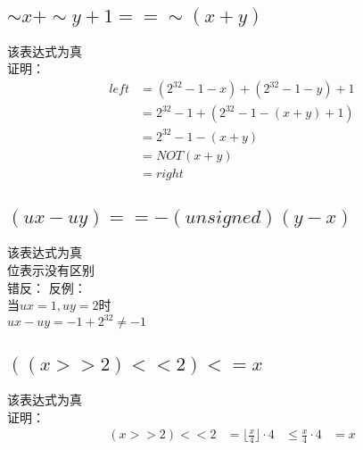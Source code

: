 \documentclass[12pt, a4paper, oneside]{ctexart}
\begin{document}
\subsection{$\sim x + \sim y + 1 == \sim (x + y)$}
\noindent
该表达式为真\\
证明：
\begin{equation}
    \begin{aligned}
        left &= (2^{32} - 1 - x) + (2^{32} - 1 - y) + 1\\
        &= 2^{32} - 1 + (2^{32} - 1 - (x + y) + 1)\\
        &= 2^{32} - 1 - (x + y)\\
        &= NOT(x + y)\\
        &= right
    \end{aligned}
\nonumber
\end{equation}
\subsection{$(ux - uy) == -(unsigned)(y - x)$}
\noindent
该表达式为真\\
位表示没有区别\\
错反：
反例：\\
当$ux = 1, uy = 2$时\\
$ux - uy = -1 + 2^{32} \ne -1$

\subsection{$ ((x >> 2) << 2) <= x$}
\noindent
该表达式为真\\
证明：
\begin{equation}
    \begin{aligned}
        (x >> 2) << 2 &= \lfloor \frac{x}{4}\rfloor \cdot 4
        &\le \frac{x}{4} \cdot 4
        &= x
    \end{aligned}
\nonumber
\end{equation}
\end{document}

